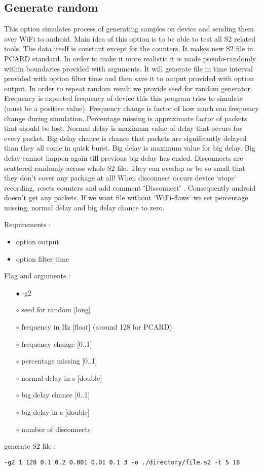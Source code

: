 \documentclass[english]{article}
\begin{document}
\subsection{Generate random}
This option simulates process of generating samples on device and sending them over WiFi to android. Main idea of this option is to be able to test all S2 related tools. The data itself is constant except for the counters. It makes new S2 file in PCARD standard. In order to make it more realistic it is made pseudo-randomly within boundaries provided with arguments. It will generate file in time interval provided with option filter time and then save it to output provided with option output. In order to repeat random result we provide seed for random generator. Frequency is expected frequency of device this this program tries to simulate (must be a positive value). Frequency change is factor of how much can frequency change during simulation. Percentage missing is approximate factor of packets that should be lost. Normal delay is maximum value of delay that occurs for every packet. Big delay chance is chance that packets are significantly delayed than they all come in quick burst. Big delay is maximum value for big delay. Big delay cannot happen again till previous big delay has ended. Disconnects are scattered randomly across whole S2 file. They can overlap or be so small that they don't cover any package at all! When disconnect occurs device `stops` recording, resets counters and add comment \''Disconnect\'' . Consequently android doesn't get any packets. If we want file without `WiFi-flaws` we set percentage missing, normal delay and big delay chance to zero. 

\noindent Requirements : 
\begin{itemize}
\item option output
\item option filter time
\end{itemize}
Flag and arguments :

\begin{itemize}
\item[$\bullet$] -g2
\item[$\circ$] seed for random [long]
\item[$\circ$] frequency in Hz [float] (around 128 for PCARD)
\item[$\circ$] frequency change [0..1]
\item[$\circ$] percentage missing [0..1]
\item[$\circ$] normal delay in s [double]
\item[$\circ$] big delay chance [0..1]
\item[$\circ$] big delay in s [double]
\item[$\circ$] number of disconnects

\end{itemize}
generate S2 file : 
\begin{lstlisting} 
-g2 1 128 0.1 0.2 0.001 0.01 0.1 3 -o ./directory/file.s2 -t 5 18
\end{lstlisting}
\end{document}
